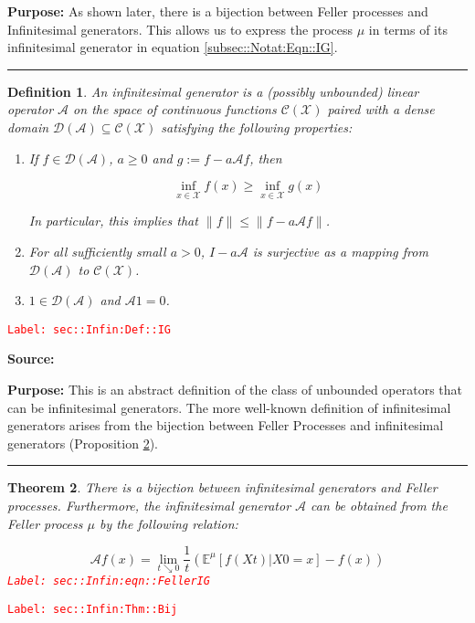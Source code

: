 \documentclass[12pt]{article}
\newcommand{\mb}{\mathbb}
\newcommand{\mc}{\mathcal}
\newcommand{\tr}{\textcolor{red}}
\newcommand{\labe}[1]{\tr{\texttt{Label: #1}}}
\newcommand{\purpose}{\textbf{Purpose: }}
\newcommand{\lin}{\rule{\linewidth}{0.4 pt}}
\newcommand{\exmu}[2]{\mb{E}^{#1}\left[#2\right]}	%
\newcommand{\x}{x}								%
\renewcommand{\t}{t}							%
\newcommand{\X}{X}								%
\newcommand{\IG}{\mc{A}}						%
\newcommand{\core}{\mc{D}}						%
\newcommand{\cont}{\mc{C}}						%
\newcommand{\m}{\mu}							%
\newcommand{\spce}{\mc{X}}						%
\newtheorem{thms}{Theorem}[section]
\newtheorem{defn}[thms]{Definition}
\begin{document}
\purpose As shown later, there is a bijection between Feller processes and Infinitesimal generators. This allows us to express the process \(\mu\) in terms of its infinitesimal generator in equation \eqref{subsec::Notat:Eqn::IG}.

\lin

\begin{defn}
An infinitesimal generator is a (possibly unbounded) linear operator \(\IG{}\) on the space of continuous functions \(\cont(\spce)\) paired with a dense domain \(\core(\IG{}) \subseteq \cont(\spce)\) satisfying the following properties:

\begin{enumerate}
\item If \(f \in \mc{D}(\IG{})\), \(a \geq 0\) and \(g:= f - a\IG{} f\), then 

\[\inf_{\x \in \spce} f(\x) \geq \inf_{\x \in \spce} g(\x)\]

\noindent In particular, this implies that \(\|f\| \leq \|f - a\IG{} f\|\).

\item For all sufficiently small \(a > 0\), \(I - a\IG{}\) is surjective as a mapping from \(\mc{D}(\IG{})\) to \(\cont(\spce)\).

\item \(1 \in \core(\IG{})\) and \(\IG{} 1 = 0\).
\end{enumerate}
\label{sec::Infin:Def::IG}
\end{defn}
\labe{sec::Infin:Def::IG}

\textbf{Source: }\cite[Definitions 2.1,2.7]{Lig85}

\purpose This is an abstract definition of the class of unbounded operators that can be infinitesimal generators. The more well-known definition of infinitesimal generators arises from the bijection between Feller Processes and infinitesimal generators (Proposition \ref{sec::Infin:Thm::Bij}).

\lin

\begin{thms}
There is a bijection between infinitesimal generators and Feller processes. Furthermore, the infinitesimal generator \(\IG{}\) can be obtained from the Feller process \(\m\) by the following relation:

\begin{equation}
\IG f(\x) = \lim_{\t\searrow 0} \frac{1}{\t}\left(\exmu{\m}{f(\X{}{\t})|\X{}{0}=\x} - f(\x)\right)
\label{sec::Infin:eqn::FellerIG}
\end{equation}
\labe{sec::Infin:eqn::FellerIG}
\label{sec::Infin:Thm::Bij}
\end{thms}
\labe{sec::Infin:Thm::Bij}
\end{document}

